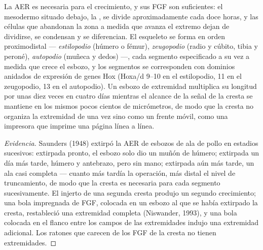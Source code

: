\begin{proposition}\label{prop:b2:limb-organogenesis:aer}
La AER es necesaria para el crecimiento, y sus FGF son suficientes: el
mesodermo situado debajo, la \emph{}, se divide
aproximadamente cada doce horas, y las células que abandonan la zona a
medida que avanza el extremo dejan de dividirse, se condensan y se
diferencian. El esqueleto se forma en orden proximodistal ---
\emph{estilopodio} (húmero o fémur), \emph{zeugopodio} (radio y cúbito,
tibia y peroné), \emph{autopodio} (muñeca y dedos) ---, cada segmento
especificado a su vez a medida que crece el esbozo, y los segmentos se
corresponden con dominios anidados de expresión de genes Hox (Hoxa/d
9--10 en el estilopodio, 11 en el zeugopodio, 13 en el autopodio). Un
esbozo de extremidad multiplica su longitud por unas diez veces en cuatro
días mientras el alcance de la señal de la cresta se mantiene en los
mismos pocos cientos de micrómetros, de modo que la cresta no organiza la
extremidad de una vez sino como un frente móvil, como una impresora que
imprime una página línea a línea.
\end{proposition}
\begin{proof}[Evidencia]
Saunders (1948) extirpó la AER de esbozos de ala de pollo en estadios
sucesivos: extirpada pronto, el esbozo solo dio un muñón de húmero;
extirpada un día más tarde, húmero y antebrazo, pero sin mano; extirpada
aún más tarde, un ala casi completa --- cuanto más tardía la operación,
más distal el nivel de truncamiento, de modo que la cresta es necesaria
para cada segmento sucesivamente. El injerto de una segunda cresta
produjo un segundo crecimiento; una bola impregnada de FGF, colocada en un
esbozo al que se había extirpado la cresta, restableció una extremidad
completa (Niswander, 1993), y una bola colocada en el flanco entre los
campos de las extremidades indujo una extremidad adicional. Los ratones
que carecen de los FGF de la cresta no tienen extremidades.
\end{proof}


